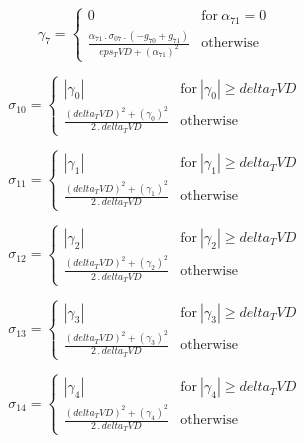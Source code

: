\documentclass{article}
\begin{document}
\begin{dmath}\gamma_{7} = \begin{cases} 0 & \text{for}\: \alpha_{71} = 0 \\\frac{\alpha_{71} \,.\, \sigma_{0 7} \,.\, \left(- g_{70} + g_{71}\right)}{eps_TVD + \left(\alpha_{71} \right)^{2}} & \text{otherwise} \end{cases}\end{dmath}

\begin{dmath}\sigma_{1 0} = \begin{cases} \left|{\gamma_{0}}\right| & \text{for}\: \left|{\gamma_{0}}\right| \geq delta_TVD \\\frac{\left(delta_TVD \right)^{2} + \left(\gamma_{0} \right)^{2}}{2 \,.\, delta_TVD} & \text{otherwise} 
\end{cases}\end{dmath}

\begin{dmath}\sigma_{1 1} = \begin{cases} \left|{\gamma_{1}}\right| & \text{for}\: \left|{\gamma_{1}}\right| \geq delta_TVD \\\frac{\left(delta_TVD \right)^{2} + \left(\gamma_{1} \right)^{2}}{2 \,.\, delta_TVD} & \text{otherwise} 
\end{cases}\end{dmath}

\begin{dmath}\sigma_{1 2} = \begin{cases} \left|{\gamma_{2}}\right| & \text{for}\: \left|{\gamma_{2}}\right| \geq delta_TVD \\\frac{\left(delta_TVD \right)^{2} + \left(\gamma_{2} \right)^{2}}{2 \,.\, delta_TVD} & \text{otherwise} 
\end{cases}\end{dmath}

\begin{dmath}\sigma_{1 3} = \begin{cases} \left|{\gamma_{3}}\right| & \text{for}\: \left|{\gamma_{3}}\right| \geq delta_TVD \\\frac{\left(delta_TVD \right)^{2} + \left(\gamma_{3} \right)^{2}}{2 \,.\, delta_TVD} & \text{otherwise} 
\end{cases}\end{dmath}

\begin{dmath}\sigma_{1 4} = \begin{cases} \left|{\gamma_{4}}\right| & \text{for}\: \left|{\gamma_{4}}\right| \geq delta_TVD \\\frac{\left(delta_TVD \right)^{2} + \left(\gamma_{4} \right)^{2}}{2 \,.\, delta_TVD} & \text{otherwise} 
\end{cases}\end{dmath}
\end{document}
